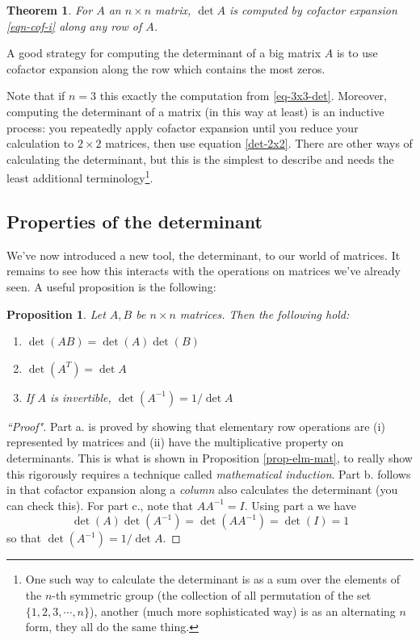 \documentclass[12pt]{article}
\numberwithin{equation}{subsection}
\numberwithin{figure}{subsection}
\newtheorem{thm}[subsection]{Theorem}
\newtheorem{prop}[subsection]{Proposition}
\theoremstyle{note}
\begin{document}
\begin{thm}
	For $A$ an $n\times n$ matrix, $\det A$ is computed by cofactor expansion \eqref{eqn-cof-i} along any row of $A$. 

\end{thm}

A good strategy for computing the determinant of a big matrix $A$ is to use cofactor expansion along the row which contains the most zeros. 

Note that if $n=3$ this exactly the computation from \eqref{eq-3x3-det}. Moreover, computing the determinant of a matrix (in this way at least) is an inductive process: you repeatedly apply cofactor expansion until you reduce your calculation to $2\times 2$ matrices, then use equation \eqref{det-2x2}. There are other ways of calculating the determinant, but this is the simplest to describe and needs the least additional terminology\footnote{One such way to calculate the determinant is as a sum over the elements of the $n$-th symmetric group (the collection of all permutation of the set $\{1,2,3,\cdots, n\}$), another (much more sophisticated way) is as an alternating $n$ form, they all do the same thing.}.

\subsection{Properties of the determinant}
We've now introduced a new tool, the determinant, to our world of matrices. It remains to see how this interacts with the operations on matrices we've already seen. A useful proposition is the following:

\begin{prop}
Let $A,B$ be $n\times n$ matrices. Then the following hold:
\begin{enumerate}
	\item $\det(AB)=\det(A)\det(B)$
	\item $\det(A^T)=\det A$
	\item If $A$ is invertible, $\det(A^{-1})=1/\det A$
\end{enumerate}
\end{prop}
\begin{proof}[``Proof"]
Part a. is proved by showing that elementary row operations are (i) represented by matrices and (ii) have the multiplicative property on determinants. This is what is shown in Proposition \ref{prop-elm-mat}, to really show this rigorously requires a technique called \textit{mathematical induction}. Part b. follows in that cofactor expansion along a \textit{column} also calculates the determinant (you can check this). For part c., note that $AA^{-1}=I$. Using part a we have \[\det(A)\det(A^{-1})=\det(AA^{-1})=\det(I)=1\] so that $\det (A^{-1})=1/\det A$. 
\end{proof}
\end{document}
